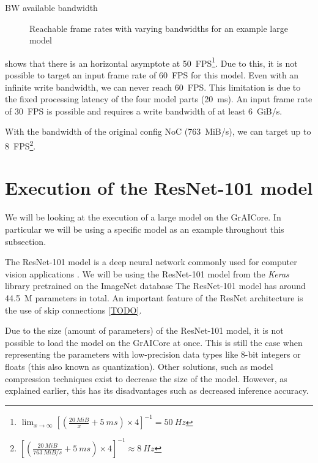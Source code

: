 \begin{eqexpl}[15mm]
    \item{$\textrm{BW}$} available bandwidth
\end{eqexpl}

\begin{figure}
    \centering
    
    \caption{Reachable frame rates with varying bandwidths for an example large model}
    \label{fig:large_model_bandwidth_analysis_example}
\end{figure}

 shows that there is an horizontal asymptote at \SI{50}{FPS}\footnote{ $\lim_{x \to \infty} \left[ \left( \frac{\SI{20}{MiB}}{x} + \SI{5}{ms} \right) \times 4 \right]^{-1} = \SI{50}{Hz}$}.
Due to this, it is not possible to target an input frame rate of \SI{60}{FPS} for this model.
Even with an infinite write bandwidth, we can never reach \SI{60}{FPS}.
This limitation is due to the fixed processing latency of the four model parts (\SI{20}{ms}).
An input frame rate of \SI{30}{FPS} is possible and requires a write bandwidth of at least \SI{6}{GiB/s}.

With the bandwidth of the original config NoC (\SI{763}{MiB/s}), we can target up to \SI{8}{FPS}\footnote{$\left[ \left( \frac{\SI{20}{MiB}}{\SI{763}{MiB/s}} + \SI{5}{ms} \right) \times 4 \right]^{-1} \approx \SI{8}{Hz}$}.
 
\section{Execution of the ResNet-101 model}

We will be looking at the execution of a large model on the GrAICore.
In particular we will be using a specific model as an example throughout this subsection.

The ResNet-101 model is a deep neural network commonly used for computer vision applications \cite{heDeepResidualLearning2015}.
We will be using the ResNet-101 model from the \textit{Keras} library \cite{KerasDocumentationResNet} pretrained on the ImageNet database \cite{russakovskyImageNetLargeScale2014}
The ResNet-101 model has around \SI{44.5}{M} parameters in total.
An important feature of the ResNet architecture is the use of skip connections \cref{TODO}.

Due to the size (amount of parameters) of the ResNet-101 model, it is not possible to load the model on the GrAICore at once.
This is still the case when representing the parameters with low-precision data types like 8-bit integers or floats (this also known as quantization).
Other solutions, such as model compression techniques exist to decrease the size of the model.
However, as explained earlier, this has its disadvantages such as decreased inference accuracy.

